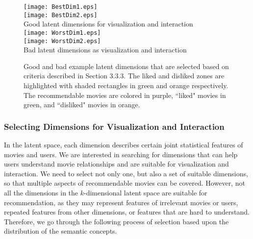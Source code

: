 \documentclass{vgtc}                          %
\begin{document}
\begin{figure}
\centering
\texttt{[image: BestDim1.eps]}\\
\vspace{+1mm}
\texttt{[image: BestDim2.eps]}\\
\vspace{+1mm}
Good latent dimensions for visualization and interaction\\
\vspace{+1mm}
\texttt{[image: WorstDim1.eps]}\\
\vspace{+1mm}
\texttt{[image: WorstDim2.eps]}\\
\vspace{+1mm}
Bad latent dimensions as visualization and interaction
\caption{Good and bad example latent dimensions that are selected based on criteria described in Section 3.3.3.
The liked and disliked zones are highlighted with shaded rectangles in green and orange respectively.
The recommendable movies are colored in purple, ``liked" movies in green, and ``disliked" movies in orange.
}
\label{svdexample}
\end{figure}

\subsubsection{Selecting Dimensions for Visualization and Interaction}

In the latent space, each dimension describes certain joint statistical features of movies and users.
We are interested in searching for dimensions that can help users understand movie relationships and are suitable for visualization and interaction.
%
We need to select not only one, but also a set of suitable dimensions, so that multiple aspects of recommendable movies can be covered.
However, not all the dimensions in the $k$-dimensional latent space are suitable for recommendation, as they may represent features of irrelevant movies or users, repeated features from other dimensions, or features that are hard to understand.
Therefore, we go through the following process of selection based upon the distribution of the semantic concepts.
\end{document}
